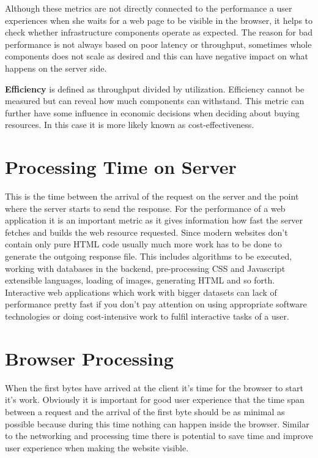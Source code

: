 Although these metrics are not directly connected to the performance a user experiences when she waits for a web page to be visible in the browser, it helps to check whether infrastructure components operate as expected. The reason for bad performance is not always based on poor latency or throughput, sometimes whole components does not scale as desired and this can have negative impact on what happens on the server side.

\textbf{Efficiency} is defined as throughput divided by utilization. Efficiency cannot be measured but can reveal how much components can withstand. This metric can further have some influence in economic decisions when deciding about buying resources. In this case it is more likely known as cost-effectiveness. \cite{Killelea_2002}
   
\section{Processing Time on Server}
This is the time between the arrival of the request on the server and the point where the server starts to send the response. For the performance of a web application it is an important metric as it gives information how fast the server fetches and builds the web resource requested. Since modern websites don't contain only pure HTML code usually much more work has to be done to generate the outgoing response file. This includes algorithms to be executed, working with databases in the backend, pre-processing CSS and Javascript extensible languages, loading of images, generating HTML and so forth. Interactive web applications which work with bigger datasets can lack of performance pretty fast if you don't pay attention on using appropriate software technologies or doing cost-intensive work to fulfil interactive tasks of a user. 

\section{Browser Processing}

When the first bytes have arrived at the client it's time for the browser to start it's work. Obviously it is important for good user experience that the time span between a request and the arrival of the first byte should be as minimal as possible because during this time nothing can happen inside the browser. Similar to the networking and processing time there is potential to save time and improve user experience when making the website visible. 

